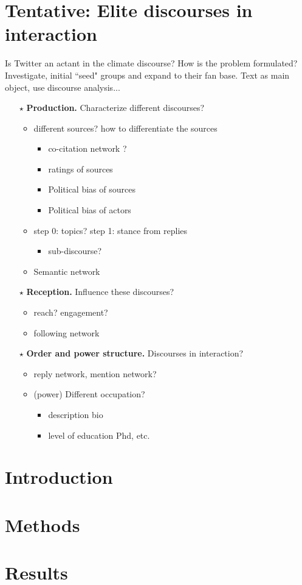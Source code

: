 \documentclass{article}
\begin{document}
\section{Tentative: {\color{red} Elite discourses in interaction}}
Is Twitter an actant in the climate discourse? How is the problem formulated? Investigate, initial ``seed" groups and expand to their fan base. Text as main object, use discourse analysis... 

			\begin{itemize}
				\item[$\star$] {\color{red} \bf Production.} Characterize different discourses? 
				
					\begin{itemize}
						\item different sources? how to differentiate the sources 
						\begin{itemize}
							\item	co-citation network ? 
							\item ratings of sources 
							\item Political bias of sources
							\item Political bias of actors 
							
						\end{itemize}
						\item	step 0: topics? step 1: stance from replies
						\begin{itemize}
							\item sub-discourse?
						\end{itemize}
						\item Semantic network
					\end{itemize}
					
				\item[$\star$]  {\color{red} \bf Reception.} Influence these discourses?
					\begin{itemize}
						\item reach? engagement?  
						\item following network
					\end{itemize}
				\item[$\star$] {\color{red} \bf Order and power structure.} Discourses in interaction?
					\begin{itemize}
					\item reply network, mention network?
					\item (power) Different occupation? 
							\begin{itemize}
								\item	description bio 
								\item level of education Phd, etc.
							\end{itemize}
					\end{itemize}

			\end{itemize}


\section{Introduction}
\section{Methods}
\section{Results}
\end{document}
